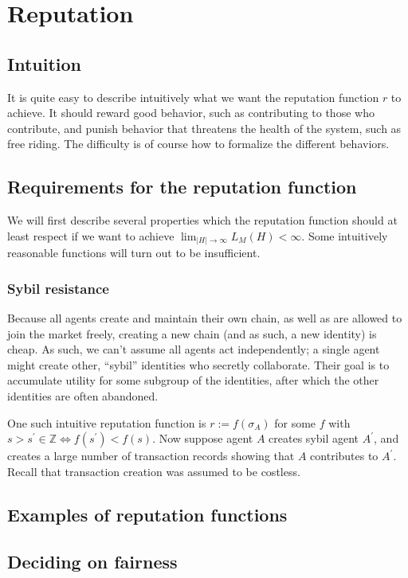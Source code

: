 \chapter{Reputation}\label{chapter:reputation}
\section{Intuition}
It is quite easy to describe intuitively what we want the reputation function $r$ to achieve. 
It should reward good behavior, 
such as contributing to those who contribute, 
and punish behavior that threatens the health of the system, 
such as free riding. 
The difficulty is of course how to formalize the different behaviors.

\section{Requirements for the reputation function}\label{section:requirements_reputation}
We will first describe several properties which the reputation function should at least respect if we want to achieve $\lim_{|H| \to \infty} L_M(H) < \infty$. Some intuitively reasonable functions will turn out to be insufficient.

\subsection{Sybil resistance}
Because all agents create and maintain their own chain, as well as are allowed to join the market freely, creating a new chain (and as such, a new identity) is cheap. As such, we can't assume all agents act independently; a single agent might create other, ``sybil'' identities who secretly collaborate. Their goal is to accumulate utility for some subgroup of the identities, after which the other identities are often abandoned.

One such intuitive reputation function is $r := f(\sigma_A)$ for some $f$ with $s > s^\prime \in \mathds{Z} \Leftrightarrow f(s^\prime) < f(s)$. Now suppose agent $A$ creates sybil agent $A^\prime$, and creates a large number of transaction records showing that $A$ contributes to $A^\prime$. Recall that transaction creation was assumed to be costless.

\section{Examples of reputation functions}\label{section:examples_reputation_functions}

\section{Deciding on fairness}
